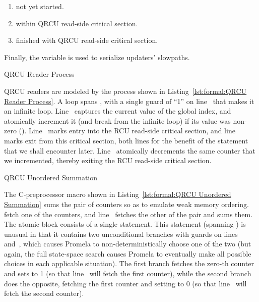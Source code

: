 \begin{enumerate}[label={\arabic*}:,start=0,itemsep=0pt]
\item	not yet started.
\item	within QRCU read-side critical section.
\item	finished with QRCU read-side critical section.
\end{enumerate}

Finally, the  variable is used to serialize updaters' slowpaths.

\begin{listing}[htbp]

\caption{QRCU Reader Process}
\label{lst:formal:QRCU Reader Process}
\end{listing}

\begin{fcvref}
QRCU readers are modeled by the  process shown in
Listing~\ref{lst:formal:QRCU Reader Process}.
A  loop spans ,
with a single guard of ``1''
on line~ that makes it an infinite loop.
Line~ captures the current value of the global index,
and 
atomically increment it (and break from the infinite loop)
if its value was non-zero ().
Line~ marks entry into the RCU read-side critical section, and
line~ marks exit from this critical section,
both lines for the benefit of
the  statement that we shall encounter later.
Line~ atomically decrements the same counter that we incremented,
thereby exiting the RCU read-side critical section.
\end{fcvref}

\begin{listing}[htbp]

\caption{QRCU Unordered Summation}
\label{lst:formal:QRCU Unordered Summation}
\end{listing}

\begin{fcvref}
The C-preprocessor macro shown in
Listing~\ref{lst:formal:QRCU Unordered Summation}
sums the pair of counters so as to emulate weak memory ordering.
 fetch one of the counters,
and line~ fetches the other
of the pair and sums them.
The atomic block consists of a single  statement.
This  statement (spanning ) is unusual in that
it contains two unconditional
branches with guards on lines~ and~, which causes Promela to
non-deterministically choose one of the two (but again, the full
state-space search causes Promela to eventually make all possible
choices in each applicable situation).
The first branch fetches the zero-th counter and sets  to 1 (so
that line~ will fetch the first counter), while the second
branch does the opposite, fetching the first counter and setting 
to 0 (so that line~ will fetch the second counter).
\end{fcvref}


